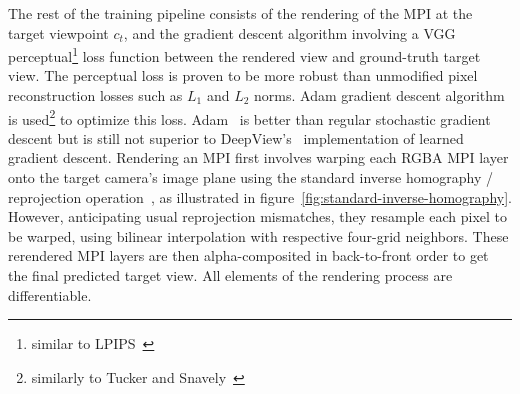 The rest of the training pipeline consists of the rendering of the MPI at the target viewpoint $c_t$, and the gradient descent algorithm involving a VGG perceptual\footnote{similar to LPIPS~\cite{zhang_unreasonable_2018}} loss function between the rendered view and ground-truth target view. The perceptual loss is proven to be more robust than unmodified pixel reconstruction losses such as $L_1$ and $L_2$ norms. Adam gradient descent algorithm is used\footnote{similarly to Tucker and Snavely~\cite{single_view_mpi}} to optimize this loss. Adam~\cite{kingma_adam_2017} is better than regular stochastic gradient descent but is still not superior to DeepView's~\cite{flynn_deepview_2019} implementation of learned gradient descent. Rendering an MPI first involves warping each RGBA MPI layer onto the target camera's image plane using the standard inverse homography / reprojection operation~\cite{hartley_multiple_2004}, as illustrated in figure~\ref{fig:standard-inverse-homography}. However, anticipating usual reprojection mismatches, they resample each pixel to be warped, using bilinear interpolation with respective four-grid neighbors. These rerendered MPI layers are then alpha-composited in back-to-front order to get the final predicted target view. All elements of the rendering process are differentiable.

